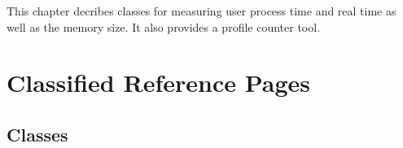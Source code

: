 


This chapter decribes classes for measuring user process time and real time
as well as the memory size.  It also provides a profile counter tool.


\section{Classified Reference Pages}

\subsection*{Classes}
\\
\\
\\
\\
